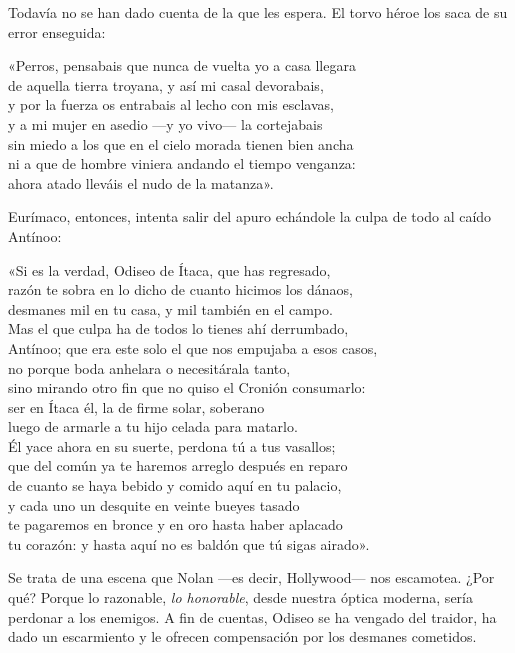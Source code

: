 Todavía no se han dado cuenta de la que les espera. El torvo héroe los saca de su error enseguida:

\begin{versocita}
«Perros, pensabais que nunca de vuelta yo a casa llegara\\
de aquella tierra troyana, y así mi casal devorabais,\\
y por la fuerza os entrabais al lecho con mis esclavas,\\
y a mi mujer en asedio ---y yo vivo--- la cortejabais\\
sin miedo a los que en el cielo morada tienen bien ancha\\
ni a que de hombre viniera andando el tiempo venganza:\\
ahora atado lleváis el nudo de la matanza».
\end{versocita}

Eurímaco, entonces, intenta salir del apuro echándole la culpa de todo al caído Antínoo:

\begin{versocita}
«Si es la verdad, Odiseo de Ítaca, que has regresado,\\
razón te sobra en lo dicho de cuanto hicimos los dánaos,\\
desmanes mil en tu casa, y mil también en el campo.\\
Mas el que culpa ha de todos lo tienes ahí derrumbado,\\
Antínoo; que era este solo el que nos empujaba a esos casos,\\
no porque boda anhelara o necesitárala tanto,\\
sino mirando otro fin que no quiso el Cronión consumarlo:\\
ser en Ítaca él, la de firme solar, soberano\\
luego de armarle a tu hijo celada para matarlo.\\
Él yace ahora en su suerte, perdona tú a tus vasallos;\\
que del común ya te haremos arreglo después en reparo\\
de cuanto se haya bebido y comido aquí en tu palacio,\\
y cada uno un desquite en veinte bueyes tasado\\
te pagaremos en bronce y en oro hasta haber aplacado\\
tu corazón: y hasta aquí no es baldón que tú sigas airado».
\end{versocita}

Se trata de una escena que Nolan ---es decir, Hollywood--- nos escamotea. ¿Por qué? Porque lo razonable, \emph{lo honorable}, desde nuestra óptica moderna, sería perdonar a los enemigos. A fin de cuentas, Odiseo se ha vengado del traidor, ha dado un escarmiento y le ofrecen compensación por los desmanes cometidos.

